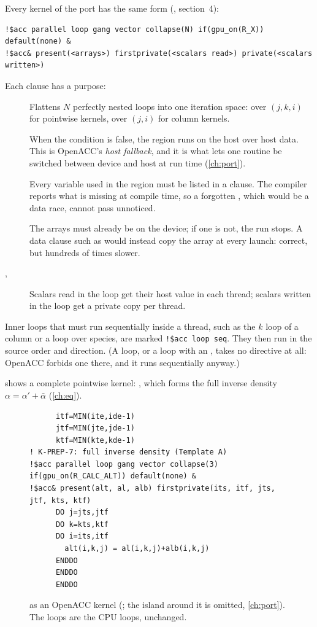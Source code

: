 Every kernel of the port has the same form (, section~4):
\begin{lstlisting}
!$acc parallel loop gang vector collapse(N) if(gpu_on(R_X)) default(none) &
!$acc& present(<arrays>) firstprivate(<scalars read>) private(<scalars written>)
\end{lstlisting}
Each clause has a purpose:
\begin{description}
  \item[] Flattens $N$ perfectly nested loops into one iteration space:  over
    $(j,k,i)$ for pointwise kernels,  over $(j,i)$ for column kernels.
  \item[] When the condition is false, the region runs on the host over host data. This is
    OpenACC's \emph{host fallback}, and it is what lets one routine be switched between device and host at run time
    (\cref{ch:port}).
  \item[] Every variable used in the region must be listed in a clause. The compiler reports what
    is missing at compile time, so a forgotten , which would be a data race, cannot pass unnoticed.
  \item[] The arrays must already be on the device; if one is not, the run stops. A data clause
    such as  would instead copy the array at every launch: correct, but hundreds of times slower.
  \item[, ] Scalars read in the loop get their host value in each thread; scalars
    written in the loop get a private copy per thread.
\end{description}

Inner loops that must run sequentially inside a thread, such as the $k$ loop of a column or a loop over species, are
marked \texttt{!\$acc loop seq}. They then run in the source order and direction. (A  loop, or a loop with
an , takes no directive at all: OpenACC forbids one there, and it runs sequentially anyway.)

 shows a complete pointwise kernel: , which forms the full inverse density
$\alpha = \alpha' + \bar\alpha$ (\cref{ch:eq}).

\begin{figure}[ht]
\begin{lstlisting}
      itf=MIN(ite,ide-1)
      jtf=MIN(jte,jde-1)
      ktf=MIN(kte,kde-1)
! K-PREP-7: full inverse density (Template A)
!$acc parallel loop gang vector collapse(3) if(gpu_on(R_CALC_ALT)) default(none) &
!$acc& present(alt, al, alb) firstprivate(its, itf, jts, jtf, kts, ktf)
      DO j=jts,jtf
      DO k=kts,ktf
      DO i=its,itf
        alt(i,k,j) = al(i,k,j)+alb(i,k,j)
      ENDDO
      ENDDO
      ENDDO
\end{lstlisting}
\caption{ as an OpenACC kernel (; the island around it is
omitted, \cref{ch:port}). The loops are the CPU loops, unchanged.}
\label{lst:calc-alt-acc}
\end{figure}

